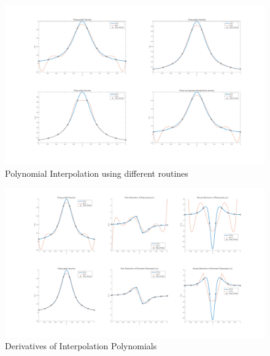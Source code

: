 \begin{figure}[!hbtp]
    \centering
    \includegraphics[width=\textwidth]{../Math.3341.Lab.08.ans/lab_08_figure_01.pdf}
    \caption{Polynomial Interpolation using different routines}
    \label{fig:1}
\end{figure}
\begin{figure}[!hbtp]
    \centering
    \includegraphics[width=\textwidth]{../Math.3341.Lab.08.ans/lab_08_figure_02.pdf}
    \caption{Derivatives of Interpolation Polynomials}
    \label{fig:2}
\end{figure}
